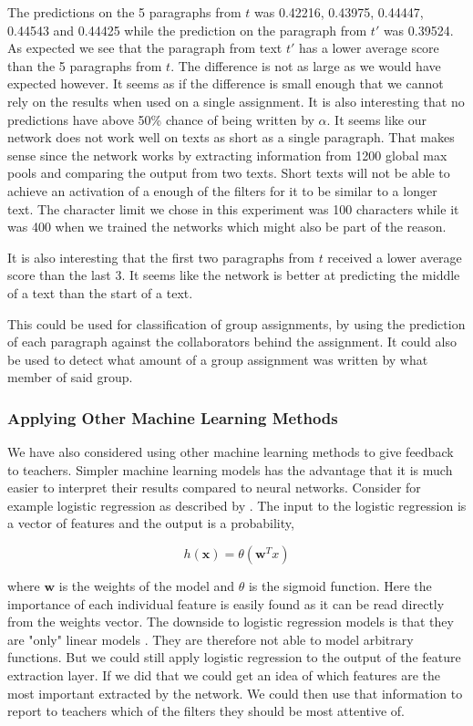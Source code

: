 The predictions on the 5 paragraphs from $t$ was 0.42216, 0.43975, 0.44447,
0.44543 and 0.44425 while the prediction on the paragraph from $t'$ was 0.39524.
As expected we see that the paragraph from text $t'$ has a lower average score
than the 5 paragraphs from $t$. The difference is not as large as we would
have expected however. It seems as if the difference is small enough that
we cannot rely on the results when used on a single assignment. It is also
interesting that no predictions have above 50\% chance of being written by
$\alpha$. It seems like our network does not work well on texts as short as
a single paragraph. That makes sense since the network works by extracting
information from 1200 global max pools and comparing the output from two texts.
Short texts will not be able to achieve an activation of a enough of the filters
for it to be similar to a longer text. The character limit we chose in this
experiment was 100 characters while it was 400 when we trained the networks
which might also be part of the reason.

It is also interesting that the first two paragraphs from $t$ received a lower
average score than the last 3. It seems like the network is better at predicting
the middle of a text than the start of a text.

This could be used for classification of group assignments, by using the
prediction of each paragraph against the collaborators behind the assignment. It
could also be used to detect what amount of a group assignment was written by
what member of said group.


\subsubsection{Applying Other Machine Learning Methods}

We have also considered using other machine learning methods to give feedback
to teachers. Simpler machine learning models has the advantage that it is much
easier to interpret their results compared to neural networks. Consider for
example logistic regression as described by \citet{Abu-Mostafa:2012:LD:2207825}.
The input to the logistic regression is a vector of features and the output is a
probability,

\begin{equation}
    h(\mathbf{x}) = \theta(\mathbf{w}^Tx)
\end{equation}

where $\mathbf{w}$ is the weights of the model and $\theta$ is the sigmoid
function. Here the importance of each individual feature is easily
found as it can be read directly from the weights vector. The downside
to logistic regression models is that they are "only" linear models
\citet{Abu-Mostafa:2012:LD:2207825}. They are therefore not able to model
arbitrary functions. But we could still apply logistic regression to the output
of the feature extraction layer. If we did that we could get an idea of which
features are the most important extracted by the network. We could then use
that information to report to teachers which of the filters they should be most
attentive of.

